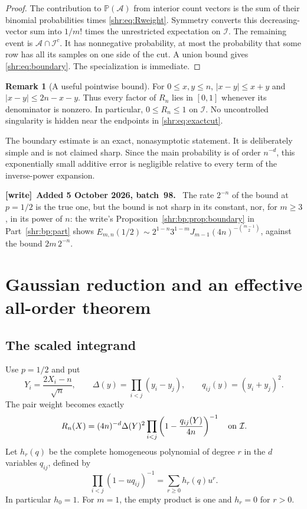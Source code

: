 \documentclass[11pt,letterpaper]{article}
\numberwithin{equation}{section}
\theoremstyle{definition}
\newtheorem{remark}[theorem]{Remark}
\newcommand{\Pp}{\mathbb P}
\newcommand{\1}{\mathbf 1}
\newenvironment{writenote}[1][]{\par\smallskip\begingroup\small
 \noindent\textbf{[write]}\if\relax\detokenize{#1}\relax\else~\textbf{#1.}\fi\ }%
 {\par\endgroup\smallskip}
\begin{document}
\begin{proof}
The contribution to $\Pp(\mathcal A)$ from interior count vectors is the
sum of their binomial probabilities times \eqref{shr:eq:Rweight}. Symmetry
converts this decreasing-vector sum into $1/m!$ times the unrestricted
expectation on $\mathcal I$. The remaining event is
$\mathcal A\cap\mathcal I^c$. It has nonnegative probability, at most the
probability that some row has all its samples on one side of the cut.
A union bound gives \eqref{shr:eq:boundary}. The specialization is immediate.
\end{proof}

\begin{remark}[A useful pointwise bound]\label{shr:rem:Rbound}
For $0\le x,y\le n$,
$|x-y|\le x+y$ and $|x-y|\le2n-x-y$. Thus every factor of
$R_n$ lies in $[0,1]$ whenever its denominator is nonzero. In particular,
$0\le R_n\le1$ on $\mathcal I$. No uncontrolled singularity is hidden
near the endpoints in \eqref{shr:eq:exactcut}.
\end{remark}

The boundary estimate is an exact, nonasymptotic statement. It is deliberately
simple and is not claimed sharp. Since the main probability is of order
$n^{-d}$, this exponentially small additive error is negligible relative
to every term of the inverse-power expansion.

\begin{writenote}[Added 5 October 2026, batch~98]
The rate $2^{-n}$ of the bound at $p=1/2$ is the true one, but the bound
is not sharp in its constant, nor, for $m\ge3$, in its power of $n$: the
write's Proposition~\ref{shr:bp:prop:boundary} in Part~\ref{shr:bp:part}
shows $E_{m,n}(1/2)\sim2^{1-n}3^{1-m}J_{m-1}(4n)^{-\binom{m-1}2}$, against
the bound $2m\,2^{-n}$.
\end{writenote}

\section{Gaussian reduction and an effective all-order theorem}

\subsection{The scaled integrand}
Use $p=1/2$ and put
\begin{equation}
 Y_i=\frac{2X_i-n}{\sqrt n},\qquad
 \Delta(y)=\prod_{i<j}(y_i-y_j),\qquad
 q_{ij}(y)=(y_i+y_j)^2.
\end{equation}
The pair weight becomes exactly
\begin{equation}
 R_n(X)=(4n)^{-d}\Delta(Y)^2
 \prod_{i<j}\left(1-\frac{q_{ij}(Y)}{4n}\right)^{-1}
 \quad\hbox{on }\mathcal I.
 \label{shr:eq:scaledweight}
\end{equation}
Let $h_r(q)$ be the complete homogeneous polynomial of degree $r$ in the
$d$ variables $q_{ij}$, defined by
\begin{equation}
 \prod_{i<j}(1-uq_{ij})^{-1}=\sum_{r\ge0}h_r(q)u^r.
 \label{shr:eq:hdef}
\end{equation}
In particular $h_0=1$. For $m=1$, the empty product is one and $h_r=0$
for $r>0$.
\end{document}
